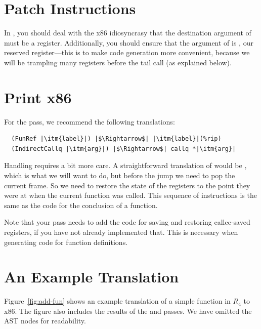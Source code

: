 \documentclass[11pt]{book}
\begin{document}
\section{Patch Instructions}

In , you should deal with the x86
idiosyncrasy that the destination argument of  must be a
register. Additionally, you should ensure that the argument of
 is , our reserved register---this is to make
code generation more convenient, because we will be trampling many
registers before the tail call (as explained below).

\section{Print x86}

For the  pass, we recommend the following translations:
\begin{lstlisting}
  (FunRef |\itm{label}|) |$\Rightarrow$| |\itm{label}|(%rip)
  (IndirectCallq |\itm{arg}|) |$\Rightarrow$| callq *|\itm{arg}|
\end{lstlisting}
Handling  requires a bit more care. A straightforward
translation of  would be , which
is what we will want to do, but before the jump we need to pop the
current frame. So we need to restore the state of the registers to the
point they were at when the current function was called.  This
sequence of instructions is the same as the code for the conclusion of
a function.

Note that your  pass needs to add the code for saving
and restoring callee-saved registers, if you have not already
implemented that. This is necessary when generating code for function
definitions.

\section{An Example Translation}

Figure~\ref{fig:add-fun} shows an example translation of a simple
function in $R_4$ to x86. The figure also includes the results of the
 and  passes.  We
have omitted the  AST nodes for readability.
\end{document}
